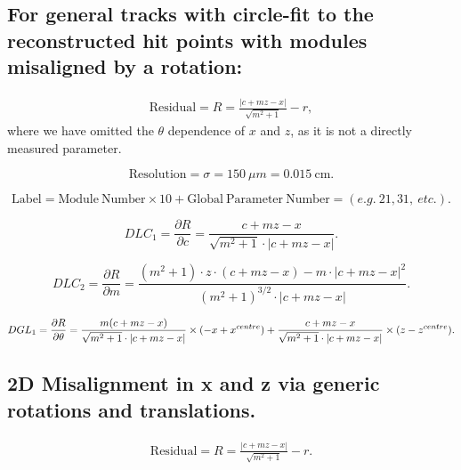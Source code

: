 \documentclass[a4paper,11pt]{article}
\begin{document}
\clearpage

\subsection{For general tracks with circle-fit to the reconstructed hit points with modules misaligned by a rotation:}
\begin{equation}
\begin{split}
\mathrm{Residual} = R =\frac{ |c+mz-x| }  { \sqrt{m^2+1} } -r,
\end{split}
\end{equation}
where we have omitted the $\theta$ dependence of $x$ and $z$, as it is not a directly measured parameter.

\begin{equation}	
\mathrm{Resolution} = \sigma = 150 \ \mu m = 0.015 \ \mathrm{cm}.
\end{equation}

\begin{equation}	
\mathrm{Label}= \mathrm{Module \ Number} \times 10 + \mathrm{Global \ Parameter \ Number} = (e.g. \ 21, 31, \ etc.).
\end{equation}

\begin{equation}
DLC_1 = \frac{\partial R}{\partial c} = \frac{ c+mz-x }  { \sqrt{m^2+1} \cdot |c+mz-x| }.
\end{equation}

\begin{equation}
DLC_2 = \frac{ \partial R}{\partial m} = \frac{ (m^2+1)\cdot z\cdot(c+mz-x) - m\cdot |c+mz-x|^2 }{ (m^2+1)^{3/2} \cdot |c+mz-x|  }.
\end{equation}

\begin{equation}	
DGL_1 = \frac{\partial R}{\partial\theta} = 
\frac{ m(c+mz-x) }  { \sqrt{m^2+1} \cdot |c+mz-x| } \times (-x + x^{centre}) + \\ \frac{ c+mz-x }  { \sqrt{m^2+1} \cdot |c+mz-x| } \times (z - z^{centre}).
\end{equation}

\subsection{2D Misalignment in x and z via generic rotations and translations.}

\begin{equation}
\begin{split}
\mathrm{Residual} = R =\frac{ |c+mz-x| }  { \sqrt{m^2+1} } -r.
\end{split}
\end{equation}
\end{document}
